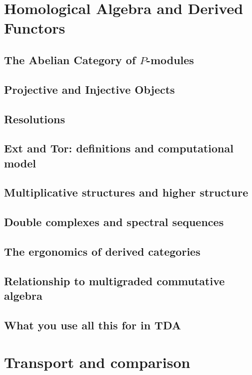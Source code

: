 \documentclass{article}
\newcommand{\<}{\langle}
\renewcommand{\>}{\rangle}
\theoremstyle{definition}
\theoremstyle{remark}
\begin{document}
	\section{Homological Algebra and Derived Functors}
	
	\subsection{The Abelian Category of $P$-modules}
	
	\subsection{Projective and Injective Objects}
	
	\subsection{Resolutions}
	
	\subsection{Ext and Tor: definitions and computational model}
	
	\subsection{Multiplicative structures and higher structure}
	
	\subsection{Double complexes and spectral sequences}
	
	\subsection{The ergonomics of derived categories}
	
	\subsection{Relationship to multigraded commutative algebra}
	
	\subsection{What you use all this for in TDA}
	
	\section{Transport and comparison}
	
\end{document}
